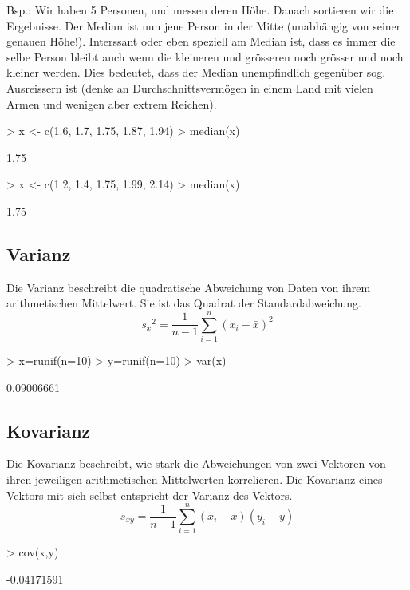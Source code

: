 Bsp.: Wir haben 5 Personen, und messen deren Höhe. Danach sortieren wir die
Ergebnisse. Der Median ist nun jene Person in der Mitte (unabhängig von seiner
genauen Höhe!). Interssant oder eben speziell am Median ist,
dass es immer die selbe Person bleibt auch wenn die kleineren und grösseren
noch grösser und noch kleiner werden. Dies bedeutet, dass der Median 
unempfindlich gegenüber sog. Ausreissern ist (denke an Durchschnittsvermögen
in einem Land mit vielen Armen und wenigen aber extrem Reichen).
\begin{Schunk}
\begin{Sinput}
> x <- c(1.6, 1.7, 1.75, 1.87, 1.94)
> median(x)
\end{Sinput}
\begin{Soutput}
[1] 1.75
\end{Soutput}
\begin{Sinput}
> x <- c(1.2, 1.4, 1.75, 1.99, 2.14)
> median(x)
\end{Sinput}
\begin{Soutput}
[1] 1.75
\end{Soutput}
\end{Schunk}

\subsection{Varianz}
Die Varianz beschreibt die quadratische Abweichung von Daten von ihrem 
arithmetischen Mittelwert. Sie ist das Quadrat der Standardabweichung. 
\[ {s_x}^2 = \frac{1}{n-1} \sum\limits_{i=1}^{n} (x_i - \bar{x})^2 \]
\begin{Schunk}
\begin{Sinput}
> x=runif(n=10)
> y=runif(n=10)
> var(x)
\end{Sinput}
\begin{Soutput}
[1] 0.09006661
\end{Soutput}
\end{Schunk}

\subsection{Kovarianz}
Die Kovarianz beschreibt, wie stark die Abweichungen von zwei Vektoren von 
ihren jeweiligen arithmetischen Mittelwerten korrelieren. Die Kovarianz 
eines Vektors mit sich selbst entspricht der Varianz des Vektors. 
\[ s_{xy} 
= \frac{1}{n-1} \sum\limits_{i=1}^{n} (x_i - \bar{x}) (y_i - \bar{y}) \]
\begin{Schunk}
\begin{Sinput}
> cov(x,y)
\end{Sinput}
\begin{Soutput}
[1] -0.04171591
\end{Soutput}
\end{Schunk}


